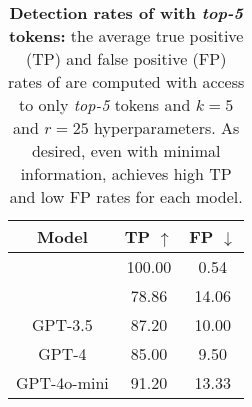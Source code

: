 \begin{table}
\caption{\textbf{Detection rates of \methodname{} with \emph{top-5} tokens:} the average true positive (TP) and false positive (FP) rates of \methodname{} are computed with access to only \emph{top-5} tokens and $k=5$ and $r=25$ hyperparameters. As desired, even with minimal information, \methodname{} achieves high TP and low FP rates for each model. }
\label{table:top5}
\begin{center}
\begin{small}
\begin{tabular}{ c c   c }
\toprule
\textbf{Model} 
& \textbf{TP $\uparrow$} &  \textbf{FP} $\downarrow$\\
\midrule
\rowcolor{black!10}\llama{}            & 100.00 & 0.54\\
\vicuna{}           & 78.86  & 14.06\\
\rowcolor{black!10}GPT-3.5             & 87.20  & 10.00\\
GPT-4               & 85.00  & 9.50\\
\rowcolor{black!10}GPT-4o-mini           & 91.20  & 13.33\\

\bottomrule
\end{tabular}
\end{small}
\end{center}
\vskip -0.1in
\end{table}

